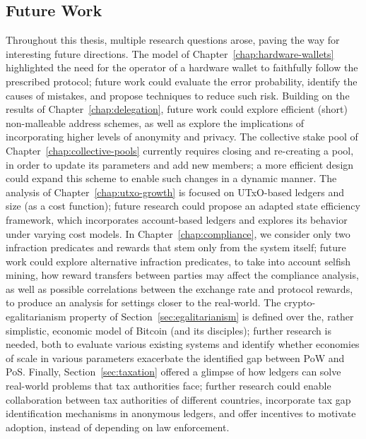 \subsection*{Future Work}

Throughout this thesis, multiple research questions arose, paving the way for
interesting future directions. The model of Chapter~\ref{chap:hardware-wallets}
highlighted the need for the operator of a hardware wallet to faithfully follow
the prescribed protocol; future work could evaluate the error probability,
identify the causes of mistakes, and propose techniques to reduce such risk.
Building on the results of Chapter~\ref{chap:delegation}, future work could
explore efficient (\ie short) non-malleable address schemes, as well as explore
the implications of incorporating higher levels of anonymity and privacy. The
collective stake pool of Chapter~\ref{chap:collective-pools} currently requires
closing and re-creating a pool, in order to update its parameters and add new
members; a more efficient design could expand this scheme to enable such
changes in a dynamic manner. The analysis of Chapter~\ref{chap:utxo-growth} is
focused on UTxO-based ledgers and size (as a cost function); future research
could propose an adapted state efficiency framework, which incorporates
account-based ledgers and explores its behavior under varying cost models. In
Chapter~\ref{chap:compliance}, we consider only two
infraction predicates and rewards that stem only from the system itself;
future work could explore alternative infraction predicates, \eg to take into account selfish mining,
how reward transfers between parties may affect the compliance analysis, as
well as possible correlations between the exchange rate and protocol rewards,
to produce an analysis for settings closer to the real-world. The
crypto-egalitarianism property of Section~\ref{sec:egalitarianism} is defined
over the, rather simplistic, economic model of Bitcoin (and its disciples);
further research is needed, both to evaluate various existing systems and
identify whether economies of scale in various parameters
exacerbate the identified gap between PoW and PoS. Finally,
Section~\ref{sec:taxation} offered a glimpse of how ledgers can
solve real-world problems that tax authorities face; further research could
enable collaboration between tax authorities of different
countries, incorporate tax gap identification mechanisms in
anonymous ledgers, and offer incentives to motivate
adoption, instead of depending on law enforcement.
